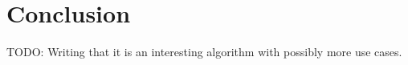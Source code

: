 \section{Conclusion}

TODO: Writing that it is an interesting algorithm with possibly more use cases.
